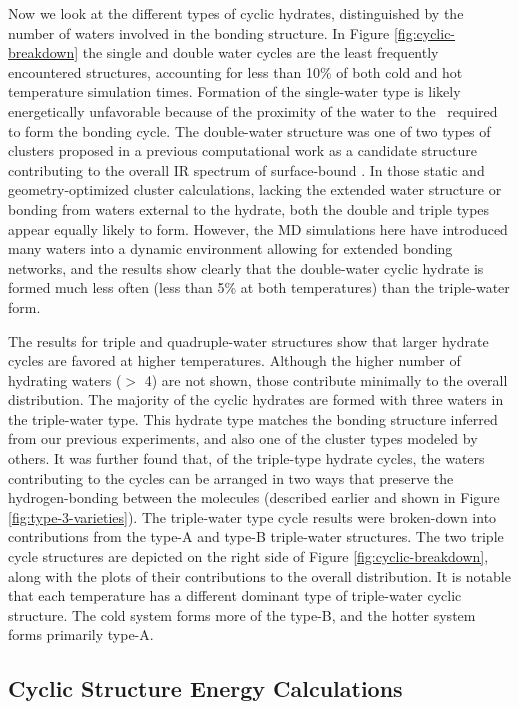 Now we look at the different types of cyclic hydrates, distinguished by the number of waters involved in the bonding structure. In Figure \ref{fig:cyclic-breakdown} the single and double water cycles are the least frequently encountered structures, accounting for less than 10\% of both cold and hot temperature simulation times. Formation of the single-water type is likely energetically unfavorable because of the proximity of the water to the \suldiox~required to form the bonding cycle. The double-water structure was one of two types of clusters proposed in a previous computational work as a candidate structure contributing to the overall IR spectrum of surface-bound \suldiox.\cite{Baer2010} In those static and geometry-optimized cluster calculations, lacking the extended water structure or bonding from waters external to the hydrate, both the double and triple types appear equally likely to form. However, the MD simulations here have introduced many waters into a dynamic environment allowing for extended bonding networks, and the results show clearly that the double-water cyclic hydrate is formed much less often (less than 5\% at both temperatures) than the triple-water form.

The results for triple and quadruple-water structures show that larger hydrate cycles are favored at higher temperatures. Although the higher number of hydrating waters ($>$ 4) are not shown, those contribute minimally to the overall distribution. The majority of the cyclic hydrates are formed with three waters in the triple-water type. This hydrate type matches the bonding structure inferred from our previous experiments, and also one of the cluster types modeled by others.\cite{Tarbuck2005,Tarbuck2006,Baer2010} It was further found that, of the triple-type hydrate cycles, the waters contributing to the cycles can be arranged in two ways that preserve the hydrogen-bonding between the molecules (described earlier and shown in Figure \ref{fig:type-3-varieties}). The triple-water type cycle results were broken-down into contributions from the type-A and type-B triple-water structures. The two triple cycle structures are depicted on the right side of Figure \ref{fig:cyclic-breakdown}, along with the plots of their contributions to the overall distribution. It is notable that each temperature has a different dominant type of triple-water cyclic structure. The cold system forms more of the type-B, and the hotter system forms primarily type-A.

\subsection {Cyclic Structure Energy Calculations}

